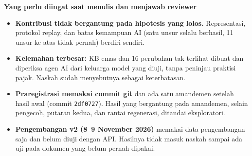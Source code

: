 \documentclass[10pt,a4paper]{article}
\begin{document}
\normalsize
\vspace{0.8em}
{\large\bfseries Yang perlu diingat saat menulis dan menjawab reviewer}
\begin{itemize}[leftmargin=1.2em, itemsep=0.2em]
\item \textbf{Kontribusi tidak bergantung pada hipotesis yang lolos.} Representasi, protokol replay, dan batas kemampuan AI
  (satu unsur selalu berhasil, 11 unsur ke atas tidak pernah) berdiri sendiri.
\item \textbf{Kelemahan terbesar:} KB emas dan 16 perubahan tak terlihat dibuat dan diperiksa agen AI dari keluarga model yang diuji,
  tanpa peninjau praktisi pajak. Naskah sudah menyebutnya sebagai keterbatasan.
\item \textbf{Praregistrasi memakai commit git} dan ada satu amandemen setelah hasil awal (commit \texttt{2df0727}).
  Hasil yang bergantung pada amandemen, selain pengecoh, putaran kedua, dan rantai regenerasi, ditandai eksploratori.
\item \textbf{Pengembangan v2 (8--9 November 2026)} memakai data pengembangan saja dan belum diuji dengan API.
  Hasilnya tidak masuk naskah sampai ada uji pada dokumen yang belum pernah dipakai.
\end{itemize}
\end{document}
